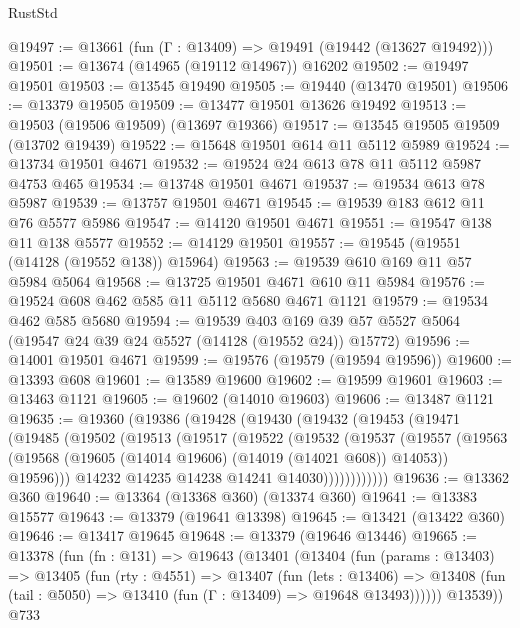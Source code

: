 \begin{lexlean}{RustStd}
\begin{coremodule}
@19497 := @13661 (fun (Γ : @13409) => @19491 (@19442 (@13627 @19492)))
@19501 := @13674 (@14965 (@19112 @14967)) @16202
@19502 := @19497 @19501
@19503 := @13545 @19490
@19505 := @19440 (@13470 @19501)
@19506 := @13379 @19505
@19509 := @13477 @19501 @13626 @19492
@19513 := @19503 (@19506 @19509) (@13697 @19366)
@19517 := @13545 @19505 @19509 (@13702 @19439)
@19522 := @15648 @19501 @614 @11 @5112 @5989
@19524 := @13734 @19501 @4671
@19532 := @19524 @24 @613 @78 @11 @5112 @5987 @4753 @465
@19534 := @13748 @19501 @4671
@19537 := @19534 @613 @78 @5987
@19539 := @13757 @19501 @4671
@19545 := @19539 @183 @612 @11 @76 @5577 @5986
@19547 := @14120 @19501 @4671
@19551 := @19547 @138 @11 @138 @5577
@19552 := @14129 @19501
@19557 := @19545 (@19551 (@14128 (@19552 @138)) @15964)
@19563 := @19539 @610 @169 @11 @57 @5984 @5064
@19568 := @13725 @19501 @4671 @610 @11 @5984
@19576 := @19524 @608 @462 @585 @11 @5112 @5680 @4671 @1121
@19579 := @19534 @462 @585 @5680
@19594 := @19539
    @403
    @169
    @39
    @57
    @5527
    @5064
    (@19547 @24 @39 @24 @5527 (@14128 (@19552 @24)) @15772)
@19596 := @14001 @19501 @4671
@19599 := @19576 (@19579 (@19594 @19596))
@19600 := @13393 @608
@19601 := @13589 @19600
@19602 := @19599 @19601
@19603 := @13463 @1121
@19605 := @19602 (@14010 @19603)
@19606 := @13487 @1121
@19635 := @19360
    (@19386
      (@19428
        (@19430
          (@19432
            (@19453
              (@19471
                (@19485
                  (@19502
                    (@19513
                      (@19517
                        (@19522
                          (@19532
                            (@19537
                              (@19557
                                (@19563
                                  (@19568 (@19605 (@14014 @19606) (@14019 (@14021 @608)) @14053))
                                  @19596)))
                            @14232
                            @14235
                            @14238
                            @14241
                            @14030))))))))))))
@19636 := @13362 @360
@19640 := @13364 (@13368 @360) (@13374 @360)
@19641 := @13383 @15577
@19643 := @13379 (@19641 @13398)
@19645 := @13421 (@13422 @360)
@19646 := @13417 @19645
@19648 := @13379 (@19646 @13446)
@19665 := @13378
    (fun (fn : @131) =>
    @19643
      (@13401
        (@13404
          (fun (params : @13403) =>
          @13405
            (fun (rty : @4551) =>
            @13407
              (fun (lets : @13406) =>
              @13408 (fun (tail : @5050) => @13410 (fun (Γ : @13409) => @19648 @13493))))))
        @13539))
    @733

\end{coremodule}
\end{lexlean}

